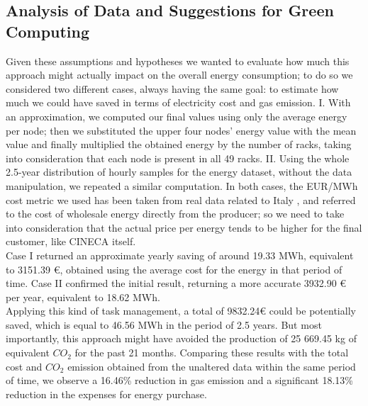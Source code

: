 \subsection{Analysis of Data and Suggestions for Green Computing}
Given these assumptions and hypotheses we wanted to evaluate how much this approach might actually impact on the overall energy consumption; to do so we considered two different cases, always having the same goal: to estimate how much we could have saved in terms of electricity cost and gas emission.
I. With an approximation, we computed our final values using only the average energy per node; then we substituted the upper four nodes’ energy value with the mean value and finally multiplied the obtained energy by the number of racks, taking into consideration that each node is present in all 49 racks.
II. Using the whole 2.5-year distribution of hourly samples for the energy dataset, without the data manipulation, we repeated a similar computation.
In both cases, the EUR/MWh cost metric we used has been taken from real data related to Italy \cite{ElectricityCost}, and referred to the cost of wholesale energy directly from the producer; so we need to take into consideration that the actual price per energy tends to be higher for the final customer, like CINECA itself.
\\
Case I returned an approximate yearly saving of around 19.33 MWh, equivalent to 3151.39 €, obtained using the average cost for the energy in that period of time. Case II confirmed the initial result, returning a more accurate 3932.90 € per year, equivalent to 18.62 MWh.
\\
Applying this kind of task management, a total of 9832.24€ could be potentially saved, which is equal to 46.56 MWh in the period of 2.5 years.
But most importantly, this approach might have avoided the production of 25 669.45 kg of equivalent $CO_2$ for the past 21 months.
Comparing these results with the total cost and $CO_2$ emission obtained from the unaltered data within the same period of time, we observe a 16.46\% reduction in gas emission and a significant 18.13\% reduction in the expenses for energy purchase.